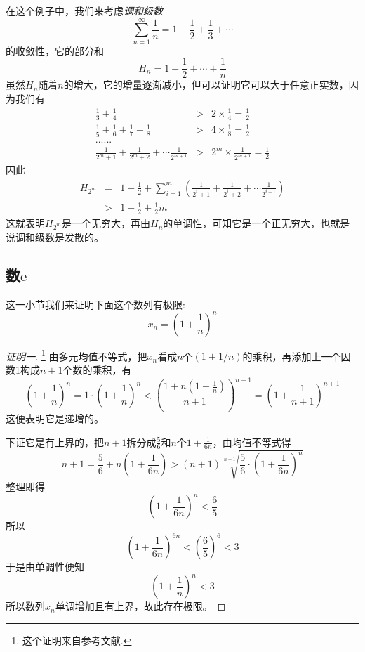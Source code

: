 \begin{example}[调和级数的发散性]
  \label{example:non-convergency-of-harmonic-series-proof-by-monotone}
  在这个例子中，我们来考虑\emph{调和级数}
  \[ \sum_{n=1}^{\infty} \frac{1}{n} = 1+\frac{1}{2} + \frac{1}{3} + \cdots  \]
  的收敛性，它的部分和
  \[ H_n = 1 + \frac{1}{2} + \cdots + \frac{1}{n} \]
  虽然$H_n$随着$n$的增大，它的增量逐渐减小，但可以证明它可以大于任意正实数，因为我们有
  \begin{eqnarray*}
    \frac{1}{3} + \frac{1}{4} & > & 2 \times \frac{1}{4} = \frac{1}{2} \\
    \frac{1}{5} + \frac{1}{6} + \frac{1}{7} + \frac{1}{8} & > & 4 \times \frac{1}{8} = \frac{1}{2} \\
    ...... && \\
    \frac{1}{2^m+1} + \frac{1}{2^m+2} + \cdots \frac{1}{2^{m+1}} & > & 2^m \times \frac{1}{2^{m+1}} = \frac{1}{2}
  \end{eqnarray*}
  因此
  \begin{eqnarray*}
    H_{2^m} & = & 1+ \frac{1}{2} + \sum_{i=1}^m \left( \frac{1}{2^i+1} + \frac{1}{2^i+2} + \cdots \frac{1}{2^{i+1}} \right) \\
    & > & 1 + \frac{1}{2} + \frac{1}{2}m
  \end{eqnarray*}
  这就表明$H_{2^m}$是一个无穷大，再由$H_n$的单调性，可知它是一个正无穷大，也就是说调和级数是发散的。
\end{example}

\subsection{数$\mathrm{e}$}
\label{sec:a-import-sequence-limit}

这一小节我们来证明下面这个数列有极限:
\[ x_n=\left( 1+\frac{1}{n} \right)^n \]

\begin{proof}[证明一]\footnote{这个证明来自参考文献\cite{olympic-math}.}
  由多元均值不等式，把$x_n$看成$n$个$(1+1/n)$的乘积，再添加上一个因数1构成$n+1$个数的乘积，有
  \[ \left( 1+\frac{1}{n} \right)^n = 1 \cdot \left( 1+\frac{1}{n} \right)^n < \left( \frac{1+n\left( 1+\frac{1}{n} \right)}{n+1} \right)^{n+1} = \left( 1+\frac{1}{n+1} \right)^{n+1} \]
  这便表明它是递增的。

  下证它是有上界的，把$n+1$拆分成$\frac{5}{6}$和$n$个$1+\frac{1}{6n}$，由均值不等式得
  \[ n+1 = \frac{5}{6} + n \left( 1+\frac{1}{6n} \right) > (n+1)\sqrt[n+1]{\frac{5}{6} \cdot \left( 1+\frac{1}{6n} \right)^n} \]
  整理即得
  \[ \left( 1+\frac{1}{6n} \right)^n < \frac{6}{5} \]
  所以
  \[ \left( 1+\frac{1}{6n} \right)^{6n} < \left( \frac{6}{5} \right)^6 < 3 \]
  于是由单调性便知
  \[ \left( 1+\frac{1}{n} \right)^n < 3 \]
  所以数列$x_n$单调增加且有上界，故此存在极限。
\end{proof}

